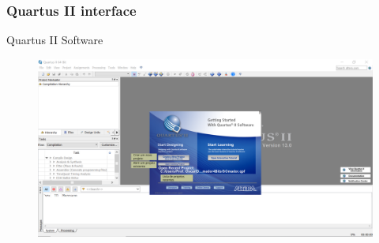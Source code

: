 \documentclass{CPSPresentation}
\begin{document}
\begin{frame}
	\frametitle{Quartus II interface}
	
	
	\begin{block}{}
		\justifying
		Quartus II Software
	\end{block}
	
	
	
	
	\begin{figure}[h]
		\centering
		\includegraphics[width=1.02\textwidth]{quartus/fig03.pdf}
	\end{figure}
	
	
\end{frame}
\end{document}
